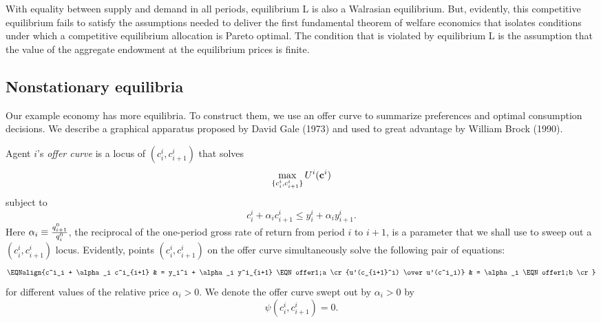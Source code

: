 With equality between supply and demand in all
periods, equilibrium L is also a Walrasian equilibrium.
But, evidently, this competitive equilibrium
fails to satisfy
  the assumptions needed to deliver the
   first fundamental theorem of welfare economics that isolates conditions under which
 a competitive equilibrium allocation is Pareto
optimal.
  The condition that is violated by  equilibrium L
is the assumption that the value of the aggregate endowment
at the equilibrium prices is finite.

\subsection{Nonstationary equilibria}\label{sec:olg_nonstat}%
\noindent 
Our example economy has more  equilibria.
To construct  them, we use an offer curve to summarize preferences and optimal consumption
decisions.   We describe a graphical apparatus proposed
by David Gale (1973) and used  to great advantage by
William Brock (1990).
%
%

\medskip
{}  Agent $i$'s {\it offer curve} is
a locus of $(c_i^i, c^i_{i+1})$ that solves
$$ \max_{\{c_i^i, c^i_{i+1}\}} U^i({\bf c}^i)  $$
subject to
$$ c_i^i + \alpha_i c_{i+1}^i \leq y_i^i + \alpha_i y^i_{i+1} .$$
Here $\alpha_i \equiv {q^0_{i+1}\over q^0_i } $,
 the reciprocal
of the one-period gross rate of return from period $i$ to $i+1$,  is 
a parameter that we shall use to sweep out a $(c_i^i, c_{i+1}^i)$ locus.
\medskip
Evidently, points $(c_i^i, c_{i+1}^i)$ on
 the offer curve simultaneously solve the following pair of equations:
$$\EQNalign{c^i_i + \alpha_i c^i_{i+1} 
        & = y_i^i + \alpha_i y^i_{i+1} \EQN offer1;a  \cr
            {u'(c_{i+1}^i) \over u'(c^i_i)} & = \alpha_i   
                                        \EQN offer1;b  \cr}$$
for  different values of the relative price $\alpha_i > 0$.  
We denote the offer curve  swept out by $\alpha_i > 0 $  by
$$ \psi(c^i_i, c^i_{i+1}) = 0 .$$


